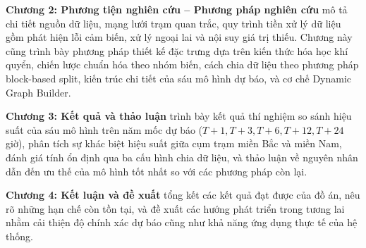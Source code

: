 \textbf{Chương 2: Phương tiện nghiên cứu -- Phương pháp nghiên cứu} mô tả chi tiết nguồn dữ liệu, mạng lưới trạm quan trắc, quy trình tiền xử lý dữ liệu gồm phát hiện lỗi cảm biến, xử lý ngoại lai và nội suy giá trị thiếu. Chương này cũng trình bày phương pháp thiết kế đặc trưng dựa trên kiến thức hóa học khí quyển, chiến lược chuẩn hóa theo nhóm biến, cách chia dữ liệu theo phương pháp block-based split, kiến trúc chi tiết của sáu mô hình dự báo, và cơ chế Dynamic Graph Builder.

\textbf{Chương 3: Kết quả và thảo luận} trình bày kết quả thí nghiệm so sánh hiệu suất của sáu mô hình trên năm mốc dự báo ($T+1, T+3, T+6, T+12, T+24$ giờ), phân tích sự khác biệt hiệu suất giữa cụm trạm miền Bắc và miền Nam, đánh giá tính ổn định qua ba cấu hình chia dữ liệu, và thảo luận về nguyên nhân dẫn đến ưu thế của mô hình tốt nhất so với các phương pháp còn lại.

\textbf{Chương 4: Kết luận và đề xuất} tổng kết các kết quả đạt được của đồ án, nêu rõ những hạn chế còn tồn tại, và đề xuất các hướng phát triển trong tương lai nhằm cải thiện độ chính xác dự báo cũng như khả năng ứng dụng thực tế của hệ thống.